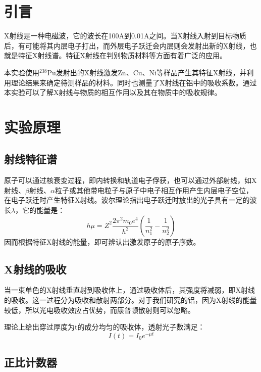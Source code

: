 \documentclass[a4paper,10.0pt,twoside]{npr}
\begin{document}
\begin{multicols}{2}

\section{引言}    %
\vspace*{-1mm}
\song\wuhao
X射线是一种电磁波，它的波长在100A到0.01A之间。当X射线入射到目标物质后，有可能将其内层电子打出，而外层电子跃迁会内层则会发射出新的X射线，也就是特征X射线谱。特征X射线在判别物质材料等方面有着广泛的应用。

本实验使用$^{238}$Pu发射出的X射线激发Zn、Cu、Ni等样品产生其特征X射线，并利用理论结果来确定待测样品的材料。同时也测量了X射线在铝中的吸收系数。通过本实验可以了解X射线与物质的相互作用以及其在物质中的吸收规律。

\section{实验原理}
\subsection{射线特征谱}
原子可以通过核衰变过程，即内转换和轨道电子俘获，也可以通过外部射线，如X射线、$\beta$射线、$\alpha$粒子或其他带电粒子与原子中电子相互作用产生内层电子空位，在电子跃迁时产生特征X射线。波尔理论指出电子跃迁时放出的光子具有一定的波长$\lambda$，它的能量是：
\begin{equation}
   h\mu = Z^2 \frac{2\pi^2m_0e^4}{h^2}(\frac{1}{n^2_1}-\frac{1}{n^2_2})
\end{equation}
因而根据特征X射线的能量，即可辨认出激发原子的原子序数。
\subsection{X射线的吸收}
当一束单色的X射线垂直射到吸收体上，通过吸收体后，其强度将减弱，即X射线的吸收。这一过程分为吸收和散射两部分。对于我们研究的铝，因为X射线的能量较低，所以光电吸收效应占优势，而康普顿散射则可以忽略。

理论上给出穿过厚度为t的成分均匀的吸收体，透射光子数满足：
\begin{equation}
   I(t)=I_0e^{-\mu t}
\end{equation}

\subsection{正比计数器}


\end{multicols}
\end{document}
